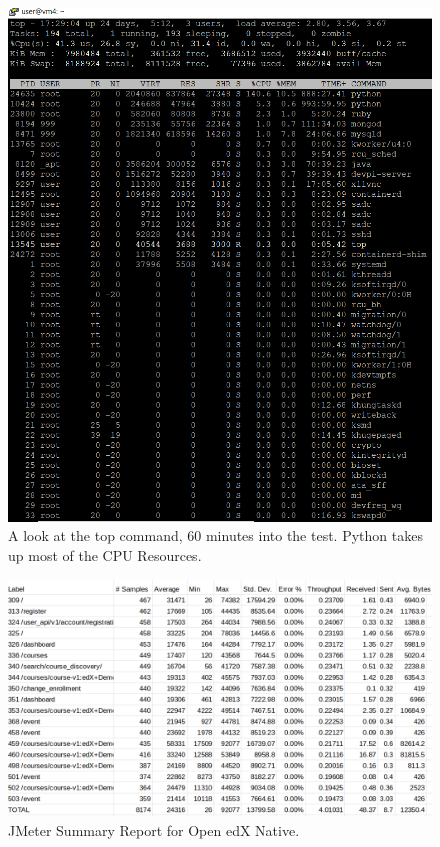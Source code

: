 \documentclass[12pt]{article}
\begin{document}
\begin{figure}[h!]
	\centering
	\includegraphics[width=\textwidth,height=\textheight,keepaspectratio]{intro/S4_harshit.png}
	\caption{A look at the top command, 60 minutes into the test. Python takes up most of the CPU Resources.}
\end{figure}

\begin{figure}[h!]
	\centering
	\includegraphics[width=\textwidth,height=\textheight,keepaspectratio]{intro/3.png}
	\caption{JMeter Summary Report for Open edX Native.}
\end{figure}
\end{document}
